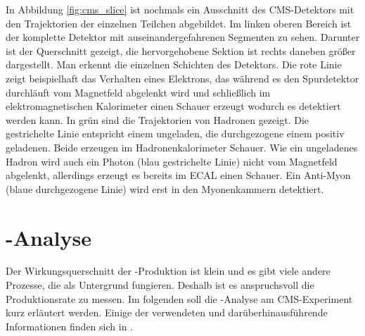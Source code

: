 In Abbildung \ref{fig:cms_slice} ist nochmals ein Ausschnitt des CMS-Detektors mit den Trajektorien der einzelnen Teilchen abgebildet. Im linken oberen Bereich ist der komplette Detektor mit auseinandergefahrenen Segmenten zu sehen. Darunter ist der Querschnitt gezeigt, die hervorgehobene Sektion ist rechts daneben gr\"o\ss er dargestellt. Man erkennt die einzelnen Schichten des Detektors. Die rote Linie zeigt beispielhaft das Verhalten eines Elektrons, das w\"ahrend es den Spurdetektor durchl\"auft vom Magnetfeld abgelenkt wird und schlie\ss lich im elektromagnetischen Kalorimeter einen Schauer erzeugt wodurch es detektiert werden kann. In gr\"un sind die Trajektorien von Hadronen gezeigt. Die gestrichelte Linie entspricht einem ungeladen, die durchgezogene einem positiv geladenen. Beide erzeugen im Hadronenkalorimeter Schauer. Wie ein ungeladenes Hadron wird auch ein Photon (blau gestrichelte Linie) nicht vom Magnetfeld abgelenkt, allerdings erzeugt es bereits im ECAL einen Schauer. Ein Anti-Myon (blaue durchgezogene Linie) wird erst in den Myonenkammern detektiert. %

\section{\ttH-Analyse}
\label{ch:Experiment:sec:ttH}

Der Wirkungsquerschnitt der \ttH-Produktion ist klein und es gibt viele andere Prozesse, die als Untergrund fungieren. Deshalb ist es anspruchsvoll die Produktionsrate zu messen. Im folgenden soll die \ttH-Analyse am CMS-Experiment kurz erl\"autert werden. Einige der verwendeten und dar\"uberhinausf\"uhrende Informationen finden sich in \cite{Khachatryan:2014qaa}.


